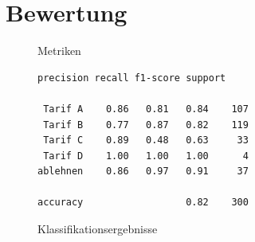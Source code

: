 \section{Bewertung}
\begin{figure}[b!]
    \captionsetup[subfigure]{justification=centering}
    \centering
    \begin{SubFloat}{Metriken\label{fig:metrics}}%
    \footnotesize
    \begin{minipage}[b]{0.45\linewidth}%
    \begin{BVerbatim}[baselinestretch=.9]
       precision recall f1-score support

 Tarif A    0.86   0.81   0.84    107
 Tarif B    0.77   0.87   0.82    119
 Tarif C    0.89   0.48   0.63     33
 Tarif D    1.00   1.00   1.00      4
ablehnen    0.86   0.97   0.91     37

accuracy                  0.82    300
    \end{BVerbatim}%
    \vspace{4em}
    \end{minipage}%
    \end{SubFloat}
    \quad
    
    \quad
    
    \caption{Klassifikationsergebnisse}
\end{figure}

